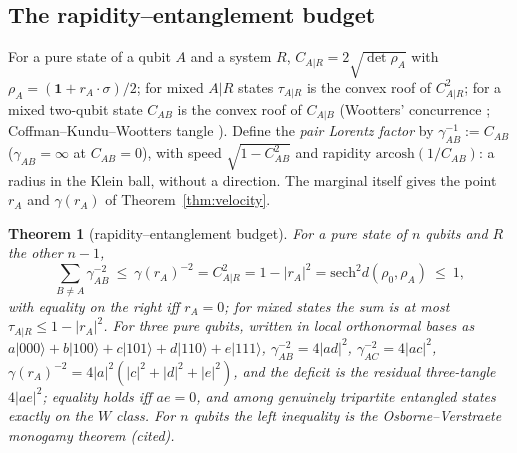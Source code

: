 \documentclass[aps,pra,onecolumn,superscriptaddress,nofootinbib,10pt]{revtex4-2}
\newtheorem{theorem}{Theorem}
\theoremstyle{definition}
\theoremstyle{remark}
\begin{document}
\subsection{The rapidity--entanglement budget}\label{sec:bdbudget}
For a pure state of a qubit $A$ and a system $R$, $C_{A|R}=2\sqrt{\det\rho_A}$ with $\rho_A=(\mathbf1+r_A\cdot\sigma)/2$; for mixed $A|R$ states $\tau_{A|R}$ is the convex
roof of $C_{A|R}^2$; for a mixed two-qubit state $C_{AB}$ is the convex roof of $C_{A|B}$ (Wootters' concurrence
\cite{Wootters}; Coffman--Kundu--Wootters tangle \cite{n4:CKW}).  Define the \emph{pair Lorentz factor} by
$\gamma_{AB}^{-1}:=C_{AB}$ ($\gamma_{AB}=\infty$ at $C_{AB}=0$), with speed $\sqrt{1-C_{AB}^2}$ and rapidity $\mathrm{arcosh}(1/C_{AB})$: a radius in the Klein ball,
without a direction.  The marginal itself gives the point $r_A$ and $\gamma(r_A)$ of Theorem~\ref{thm:velocity}.

\begin{theorem}[rapidity--entanglement budget]\label{thm:bdbudget}
For a pure state of $n$ qubits and $R$ the other $n-1$,
\begin{equation}\label{eq:bdbudget}
\sum_{B\ne A}\gamma_{AB}^{-2}\ \le\ \gamma(r_A)^{-2}=C_{A|R}^2=1-\lvert r_A\rvert^2=\mathrm{sech}^2d(\rho_0,\rho_A)\ \le\ 1 ,
\end{equation}
with equality on the right iff $r_A=0$; for mixed states the sum is at most $\tau_{A|R}\le1-\lvert r_A\rvert^2$.  For three pure qubits, written
in local orthonormal bases as $a\lvert000\rangle+b\lvert100\rangle+c\lvert101\rangle+d\lvert110\rangle+e\lvert111\rangle$, $\gamma_{AB}^{-2}=4\lvert ad\rvert^2$, $\gamma_{AC}^{-2}=4\lvert ac\rvert^2$, $\gamma(r_A)^{-2}=4\lvert a\rvert^2(\lvert c\rvert^2+\lvert d\rvert^2+\lvert e\rvert^2)$,
and the deficit is the residual three-tangle $4\lvert ae\rvert^2$; equality holds iff $ae=0$, and among genuinely tripartite
entangled states exactly on the $W$ class.  For $n$ qubits the left inequality is the Osborne--Verstraete
monogamy theorem \cite[Eq.~(1)]{n4:OV} (cited).
\end{theorem}
\end{document}
